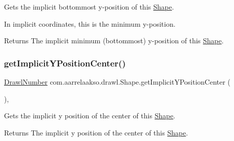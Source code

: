 Gets the implicit bottommost y-\/position of this \hyperlink{classcom_1_1aarrelaakso_1_1drawl_1_1_shape}{Shape}. 

In implicit coordinates, this is the minimum y-\/position.

\begin{DoxyReturn}{Returns}
The implicit minimum (bottommost) y-\/position of this \hyperlink{classcom_1_1aarrelaakso_1_1drawl_1_1_shape}{Shape}. 
\end{DoxyReturn}
\mbox{\label{classcom_1_1aarrelaakso_1_1drawl_1_1_shape_a0549739ee3201ae16091acce4ee6a5ac}} 
\subsubsection{\texorpdfstring{get\+Implicit\+Y\+Position\+Center()}{getImplicitYPositionCenter()}}
{\footnotesize\ttfamily \hyperlink{classcom_1_1aarrelaakso_1_1drawl_1_1_drawl_number}{Drawl\+Number} com.\+aarrelaakso.\+drawl.\+Shape.\+get\+Implicit\+Y\+Position\+Center (\begin{DoxyParamCaption}{ }\end{DoxyParamCaption})\hspace{0.3cm}{\ttfamily [protected]}, {\ttfamily [inherited]}}



Gets the implicit y position of the center of this \hyperlink{classcom_1_1aarrelaakso_1_1drawl_1_1_shape}{Shape}. 

\begin{DoxyReturn}{Returns}
The implicit y position of the center of this \hyperlink{classcom_1_1aarrelaakso_1_1drawl_1_1_shape}{Shape}. 
\end{DoxyReturn}
\mbox{\label{classcom_1_1aarrelaakso_1_1drawl_1_1_circle_ae0bd8b2be28e991318bbc8e37b99553d}} 
